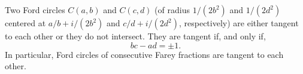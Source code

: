 Two Ford circles $C(a, b)$ and $C(c, d)$ (of radius $1/(2b^2)$ and $1/(2d^2)$ centered at $a/b + i/(2b^2)$ and $c/d + i/(2d^2)$, respectively) are either tangent to each other or they do not intersect. They are tangent if, and only if,
$$bc - ad = \pm 1.$$
In particular, Ford circles of consecutive Farey fractions are tangent to each other.
